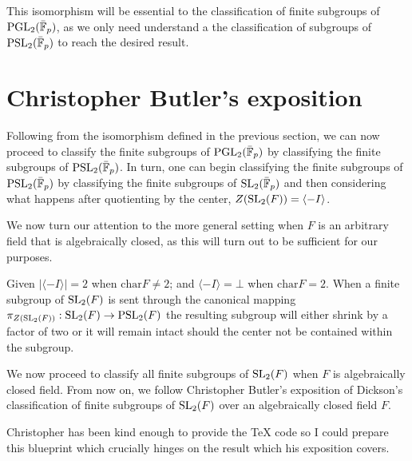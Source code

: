 This isomorphism will be essential to the classification of finite subgroups of $\operatorname{PGL}_2(\bar{\mathbb{F}}_p)$, as we only need understand a the classification of subgroups of $\operatorname{PSL}_2(\bar{\mathbb{F}}_p)$ to reach the desired result.


\section{Christopher Butler's exposition}

Following from the isomorphism defined in the previous section, we can now proceed to classify the finite subgroups of $\operatorname{PGL}_2(\bar{\mathbb{F}}_p)$ by classifying the finite subgroups of $\operatorname{PSL}_2(\bar{\mathbb{F}}_p)$. 
In turn, one can begin classifying the finite subgroups of $\operatorname{PSL}_2(\bar{\mathbb{F}}_p)$ by classifying the finite subgroups of $\operatorname{SL}_2(\bar{\mathbb{F}}_p)$ and then considering what happens after
quotienting by the center, $Z(\operatorname{SL}_2(F)) = \langle -I\rangle$.

We now turn our attention to the more general setting when $F$ is an arbitrary field that is algebraically closed, as this will turn out to be sufficient for our purposes.

Given $|\langle -I \rangle| = 2$ when $\textrm{char} F \ne 2$; and $\langle -I\rangle = \bot$ when $\textrm{char} F = 2$.
When a finite subgroup of $\operatorname{SL}_2(F)$ is sent through the canonical mapping $\pi_{Z(\operatorname{SL}_2(F))} : \operatorname{SL}_2(F) \rightarrow \operatorname{PSL}_2(F)$ 
the resulting subgroup will either shrink by a factor of two or it will remain intact should the center not be contained within the subgroup. 

We now proceed to classify all finite subgroups of $\operatorname{SL}_2(F)$ when $F$ is algebraically closed field. 
From now on, we follow Christopher Butler's exposition of Dickson's classification of finite subgroups of $\operatorname{SL}_2(F)$ over an algebraically closed field $F$. 

Christopher has been kind enough to provide the TeX code so I could prepare this blueprint which crucially hinges on the result which his exposition \cite{butler} covers.